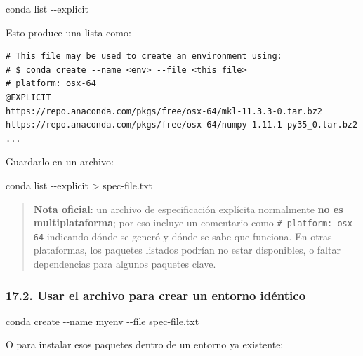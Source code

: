 \documentclass[
  doc,
  floatsintext,
  longtable,
  a4paper,
  nolmodern,
  notxfonts,
  notimes,
  12pt,
  colorlinks=true,linkcolor=blue,citecolor=blue,urlcolor=blue]{apa7}
\newenvironment{Shaded}{\begin{snugshade}}{\end{snugshade}}
\newcommand{\AttributeTok}[1]{\textcolor[rgb]{0.40,0.45,0.13}{#1}}
\newcommand{\ExtensionTok}[1]{\textcolor[rgb]{0.00,0.23,0.31}{#1}}
\newcommand{\NormalTok}[1]{\textcolor[rgb]{0.00,0.23,0.31}{#1}}
\newcommand{\OperatorTok}[1]{\textcolor[rgb]{0.37,0.37,0.37}{#1}}
\begin{document}
\begin{Shaded}
\begin{Highlighting}[]
\ExtensionTok{conda}\NormalTok{ list }\AttributeTok{{-}{-}explicit}
\end{Highlighting}
\end{Shaded}

Esto produce una lista como:

\begin{verbatim}
# This file may be used to create an environment using:
# $ conda create --name <env> --file <this file>
# platform: osx-64
@EXPLICIT
https://repo.anaconda.com/pkgs/free/osx-64/mkl-11.3.3-0.tar.bz2
https://repo.anaconda.com/pkgs/free/osx-64/numpy-1.11.1-py35_0.tar.bz2
...
\end{verbatim}

Guardarlo en un archivo:

\begin{Shaded}
\begin{Highlighting}[]
\ExtensionTok{conda}\NormalTok{ list }\AttributeTok{{-}{-}explicit} \OperatorTok{\textgreater{}}\NormalTok{ spec{-}file.txt}
\end{Highlighting}
\end{Shaded}

\begin{quote}
\textbf{Nota oficial}: un archivo de especificación explícita
normalmente \textbf{no es multiplataforma}; por eso incluye un
comentario como \texttt{\#\ platform:\ osx-64} indicando dónde se generó
y dónde se sabe que funciona. En otras plataformas, los paquetes
listados podrían no estar disponibles, o faltar dependencias para
algunos paquetes clave.
\end{quote}

\subsubsection{17.2. Usar el archivo para crear un entorno
idéntico}\label{usar-el-archivo-para-crear-un-entorno-iduxe9ntico}

\begin{Shaded}
\begin{Highlighting}[]
\ExtensionTok{conda}\NormalTok{ create }\AttributeTok{{-}{-}name}\NormalTok{ myenv }\AttributeTok{{-}{-}file}\NormalTok{ spec{-}file.txt}
\end{Highlighting}
\end{Shaded}

O para instalar esos paquetes dentro de un entorno ya existente:
\end{document}
